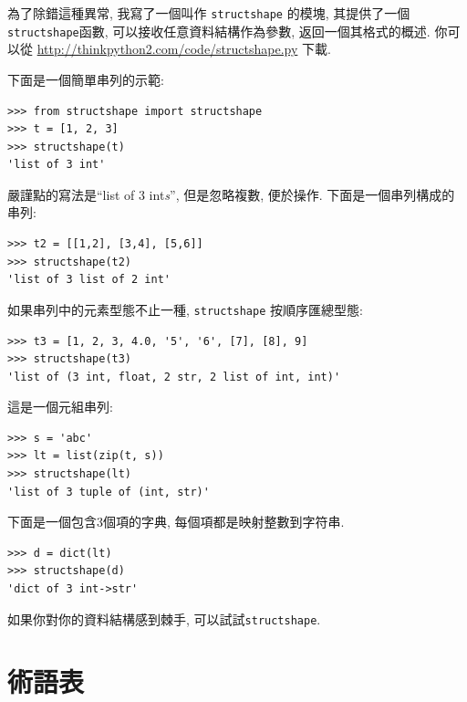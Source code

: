 \documentclass[10pt]{book}
\begin{document}
為了除錯這種異常, 我寫了一個叫作 {\tt structshape} 的模塊, 
其提供了一個{\tt structshape}函數, 可以接收任意資料結構作為參數, 
返回一個其格式的概述. 
你可以從 \url{http://thinkpython2.com/code/structshape.py} 下載. 

下面是一個簡單串列的示範:

\begin{verbatim}
>>> from structshape import structshape
>>> t = [1, 2, 3]
>>> structshape(t)
'list of 3 int'
\end{verbatim}
%

嚴謹點的寫法是``list of 3 int{\em s}'', 
但是忽略複數, 便於操作. 下面是一個串列構成的串列:

\begin{verbatim}
>>> t2 = [[1,2], [3,4], [5,6]]
>>> structshape(t2)
'list of 3 list of 2 int'
\end{verbatim}
%
如果串列中的元素型態不止一種, 
{\tt structshape} 按順序匯總型態:

\begin{verbatim}
>>> t3 = [1, 2, 3, 4.0, '5', '6', [7], [8], 9]
>>> structshape(t3)
'list of (3 int, float, 2 str, 2 list of int, int)'
\end{verbatim}
%
這是一個元組串列:

\begin{verbatim}
>>> s = 'abc'
>>> lt = list(zip(t, s))
>>> structshape(lt)
'list of 3 tuple of (int, str)'
\end{verbatim}
%
下面是一個包含3個項的字典, 每個項都是映射整數到字符串.

\begin{verbatim}
>>> d = dict(lt) 
>>> structshape(d)
'dict of 3 int->str'
\end{verbatim}
%
如果你對你的資料結構感到棘手, 可以試試{\tt structshape}.


\section{術語表}
\end{document}
